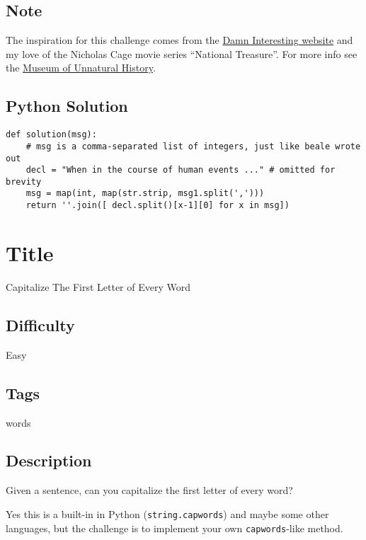 \subsection{Note}\label{note-1}

The inspiration for this challenge comes from the
\href{http://www.damninteresting.com/89-263-201-500-337-480/}{Damn
Interesting website} and my love of the Nicholas Cage movie series
``National Treasure''. For more info see the
\href{http://www.unmuseum.org/bealepap.htm}{Museum of Unnatural
History}.

\subsection{Python Solution}\label{python-solution-1}

\begin{verbatim}
def solution(msg):
    # msg is a comma-separated list of integers, just like beale wrote out
    decl = "When in the course of human events ..." # omitted for brevity
    msg = map(int, map(str.strip, msg1.split(',')))
    return ''.join([ decl.split()[x-1][0] for x in msg])
\end{verbatim}

\section{Title}\label{title-18}

Capitalize The First Letter of Every Word

\subsection{Difficulty}\label{difficulty-17}

Easy

\subsection{Tags}\label{tags-18}

words

\subsection{Description}\label{description-18}

Given a sentence, can you capitalize the first letter of every word?

Yes this is a built-in in Python (\texttt{string.capwords}) and maybe
some other languages, but the challenge is to implement your own
\texttt{capwords}-like method.

